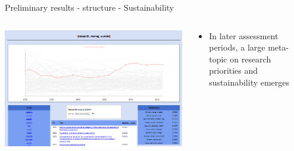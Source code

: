 \documentclass[9pt]{beamer}
\begin{document}
\begin{frame}{Preliminary results - structure - Sustainability}



\begin{columns}
	\begin{column}{0.6\linewidth}
		\begin{center}			
			\includegraphics[width=\linewidth]{../plots/sustainability.PNG}
		\end{center}
	\end{column}
	\begin{column}{0.4\linewidth}
		\begin{center}
			\begin{itemize}
				\item In later assessment periods, a large meta-topic on research priorities and sustainability emerges
			\end{itemize}
		\end{center}
	\end{column}
\end{columns}

\end{frame}
\end{document}
